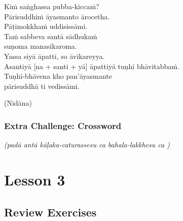 \documentclass[11pt,oneside]{memoir}
\begin{document}
Kiṁ saṅghassa pubba-kiccaṁ? \\[0pt]
Pārisuddhiṁ āyasmanto ārocetha. \\[0pt]
Pāṭimokkhaṁ uddisissāmi. \\[0pt]
Taṁ sabbeva santā sādhukaṁ \\[0pt]
suṇoma manasikaroma. \\[0pt]
Yassa siyā āpatti, so āvikareyya. \\[0pt]
Asantiyā [na + santi + yā] āpattiyā tuṇhī bhāvitabbaṁ. \\[0pt]
Tuṇhī-bhāvena kho pan'āyasmante \\[0pt]
pārisuddhā ti vedissāmi.

(Nidāna)

\clearpage

\subsection{Extra Challenge: Crossword}
\label{sec:orga2587bd}

\begin{Puzzle}{13}{9}%

\end{Puzzle}

\vspace*{\baselineskip}

{\centering
\textit{(padā antā kāḷaka-caturassesu ca  bahala-lakkhesu ca )}
\par}

\vspace*{\baselineskip}



\ifanswerkey

\vspace*{\baselineskip}

\PuzzleSolution[true]

\begin{Puzzle}{13}{9}%

\end{Puzzle}

\fi

\chapter{Lesson 3}
\label{sec:org3f45c2e}
\section{Review Exercises}
\label{sec:org3afe7a8}
\end{document}
